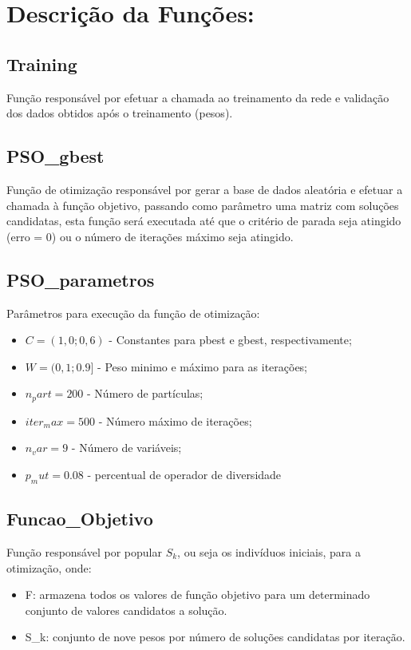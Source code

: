 \documentclass{IEEEtran}
\begin{document}
\section{Descrição da Funções:}

\subsection{Training}
Função responsável por efetuar a chamada  ao treinamento da rede e validação dos dados obtidos após o treinamento (pesos).
\subsection{PSO\_gbest}
Função de otimização  responsável por gerar a base de dados aleatória e efetuar a chamada à função objetivo, passando como parâmetro uma matriz com soluções candidatas, esta função será executada até que o critério de parada seja atingido (erro = 0) ou o número de iterações máximo seja atingido.
\subsection{PSO\_parametros}
Parâmetros para execução da função de otimização:
\begin{itemize}
	\item $C = (1,0;0,6)$ - Constantes para pbest e gbest, respectivamente;
	\item $W = (0,1;0.9]$ - Peso minimo e máximo para as iterações;
	\item $n_part = 200$ - Número de partículas;
	\item $iter_max = 500$ - Número máximo de iterações;
	\item $n_var =  9$ - Número de variáveis;
	\item $p_mut = 0.08$ - percentual de operador de diversidade
\end{itemize}
\subsection{Funcao\_Objetivo}
Função responsável por popular $S_k$, ou seja os indivíduos iniciais, para a otimização, onde: 
\begin{itemize}
	\item F:   armazena todos os valores de função objetivo para um determinado
conjunto de valores candidatos a solução.
	\item S\_k:   conjunto de nove pesos por número de soluções candidatas por iteração. 
\end{itemize}
\end{document}
